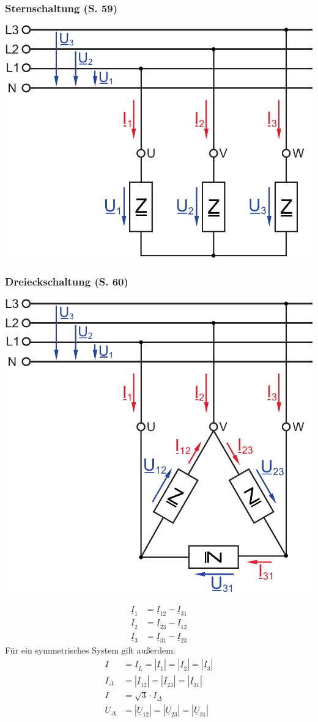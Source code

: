 \documentclass[a4paper,twocolumn,10pt]{article}
\begin{document}
\subsubsection{Sternschaltung (S. 59)}
\begin{center}
\includegraphics[width=0.5\columnwidth]{Grafiken/Sternschaltung}
\end{center}

\subsubsection{Dreieckschaltung (S. 60)}
\begin{center}
\includegraphics[width=0.5\columnwidth]{Grafiken/Dreieckschaltung}
\end{center}
\begin{equation*}
\begin{split}
\underline{I}_1&=\underline{I}_{12}-\underline{I}_{31}\\
\underline{I}_2&=\underline{I}_{23}-\underline{I}_{12}\\
\underline{I}_3&=\underline{I}_{31}-\underline{I}_{23}
\end{split}
\end{equation*}
Für ein symmetrisches System gilt außerdem:
\begin{equation*}
\begin{split}
\underline{I}&=\underline{I}_L=|\underline{I}_1|=|\underline{I}_2|=|\underline{I}_3|\\
I_{\Delta}&=|\underline{I}_{12}|=|\underline{I}_{23}|=|\underline{I}_{31}|\\
I&=\sqrt{3}\cdot I_{\Delta}\\
U_{\Delta}&=|\underline{U}_{12}|=|\underline{U}_{23}|=|\underline{U}_{31}|
\end{split}
\end{equation*}
\end{document}
